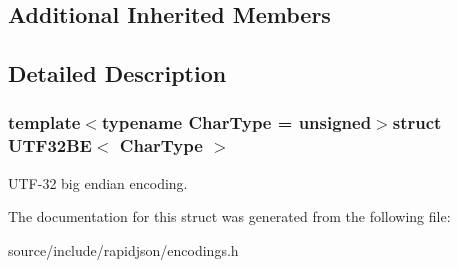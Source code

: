 \subsection*{Additional Inherited Members}


\subsection{Detailed Description}
\subsubsection*{template$<$typename Char\+Type = unsigned$>$struct U\+T\+F32\+B\+E$<$ Char\+Type $>$}

U\+T\+F-\/32 big endian encoding. 

The documentation for this struct was generated from the following file\+:\begin{DoxyCompactItemize}
\item 
source/include/rapidjson/encodings.\+h\end{DoxyCompactItemize}
